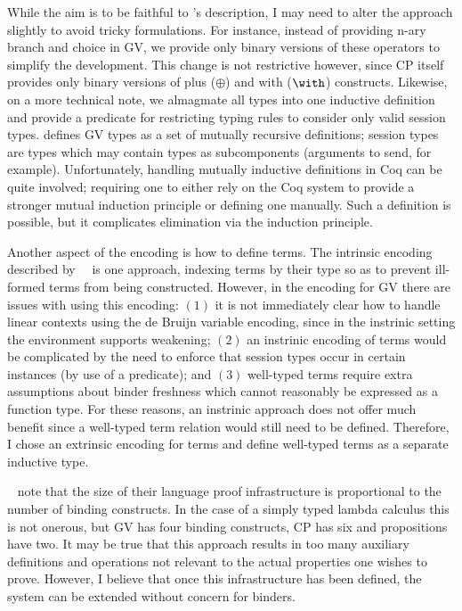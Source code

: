 \documentclass{mprop}
\begin{document}
While the aim is to be faithful to \citeauthor{Wadler:2012}'s description, I may need to alter the approach slightly to avoid tricky formulations. For instance, instead of providing n-ary branch and choice in GV, we provide only binary versions of these operators to simplify the development. This change is not restrictive however, since CP itself provides only binary versions of plus ($\oplus$) and with ($\with$) constructs. Likewise, on a more technical note, we almagmate all types into one inductive definition and provide a predicate for restricting typing rules to consider only valid session types. \citeauthor{Wadler:2012} defines GV types as a set of mutually recursive definitions; session types are types which may contain types as subcomponents (arguments to send, for example). Unfortunately, handling mutually inductive definitions in Coq can be quite involved; requiring one to either rely on the Coq system to provide a stronger mutual induction principle or defining one manually. Such a definition is possible, but it complicates elimination via the induction principle.

Another aspect of the encoding is how to define terms. The intrinsic encoding described by~\citeauthor{Benton:2012:STT}~\cite{Benton:2012:STT} is one approach, indexing terms by their type so as to prevent ill-formed terms from being constructed. However, in the encoding for GV there are issues with using this encoding: $(1)$ it is not immediately clear how to handle linear contexts using the de Bruijn variable encoding, since in the instrinic setting the environment supports weakening; $(2)$ an instrinic encoding of terms would be complicated by the need to enforce that session types occur in certain instances (by use of a predicate); and $(3)$ well-typed terms require extra assumptions about binder freshness which cannot reasonably be expressed as a function type. For these reasons, an instrinic approach does not offer much benefit since a well-typed term relation would still need to be defined. Therefore, I chose an extrinsic encoding for terms and define well-typed terms as a separate inductive type.

\citeauthor{Aydemir:2008:EFM}~\cite{Aydemir:2008:EFM} note that the size of their language proof infrastructure is proportional to the number of binding constructs. In the case of a simply typed lambda calculus this is not onerous, but GV has four binding constructs, CP has six and propositions have two. It may be true that this approach results in too many auxiliary definitions and operations not relevant to the actual properties one wishes to prove. However, I believe that once this infrastructure has been defined, the system can be extended without concern for binders.
\end{document}
